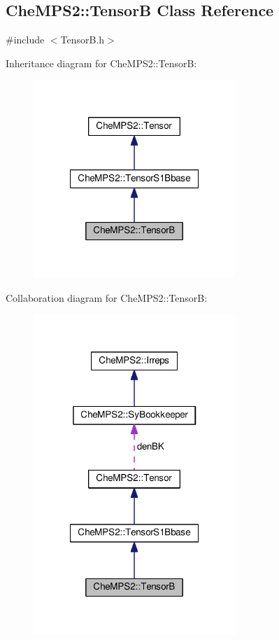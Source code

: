 \hypertarget{classCheMPS2_1_1TensorB}{\subsection{Che\-M\-P\-S2\-:\-:Tensor\-B Class Reference}
\label{classCheMPS2_1_1TensorB}
}


{\ttfamily \#include $<$Tensor\-B.\-h$>$}



Inheritance diagram for Che\-M\-P\-S2\-:\-:Tensor\-B\-:\nopagebreak
\begin{figure}[H]
\begin{center}
\leavevmode
\includegraphics[width=216pt]{classCheMPS2_1_1TensorB__inherit__graph}
\end{center}
\end{figure}


Collaboration diagram for Che\-M\-P\-S2\-:\-:Tensor\-B\-:\nopagebreak
\begin{figure}[H]
\begin{center}
\leavevmode
\includegraphics[width=216pt]{classCheMPS2_1_1TensorB__coll__graph}
\end{center}
\end{figure}
